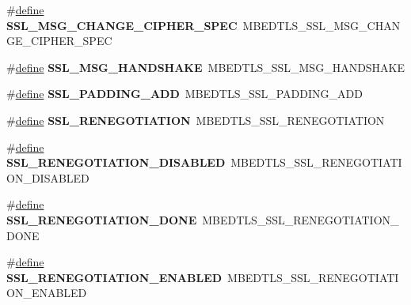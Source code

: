 \begin{DoxyCompactItemize}
\item 
\mbox{\label{compat-1_83_8h_a738eccdfea2b6a0de26231a0c2aafe4f}} 
\#\hyperlink{structdefine}{define} {\bfseries S\+S\+L\+\_\+\+M\+S\+G\+\_\+\+C\+H\+A\+N\+G\+E\+\_\+\+C\+I\+P\+H\+E\+R\+\_\+\+S\+P\+EC}~M\+B\+E\+D\+T\+L\+S\+\_\+\+S\+S\+L\+\_\+\+M\+S\+G\+\_\+\+C\+H\+A\+N\+G\+E\+\_\+\+C\+I\+P\+H\+E\+R\+\_\+\+S\+P\+EC
\item 
\mbox{\label{compat-1_83_8h_add1f218869a9aeb6f8b1190a99f0625a}} 
\#\hyperlink{structdefine}{define} {\bfseries S\+S\+L\+\_\+\+M\+S\+G\+\_\+\+H\+A\+N\+D\+S\+H\+A\+KE}~M\+B\+E\+D\+T\+L\+S\+\_\+\+S\+S\+L\+\_\+\+M\+S\+G\+\_\+\+H\+A\+N\+D\+S\+H\+A\+KE
\item 
\mbox{\label{compat-1_83_8h_a5838cb2225af69ac4e71284c3186b1c6}} 
\#\hyperlink{structdefine}{define} {\bfseries S\+S\+L\+\_\+\+P\+A\+D\+D\+I\+N\+G\+\_\+\+A\+DD}~M\+B\+E\+D\+T\+L\+S\+\_\+\+S\+S\+L\+\_\+\+P\+A\+D\+D\+I\+N\+G\+\_\+\+A\+DD
\item 
\mbox{\label{compat-1_83_8h_aa061ebaead3d10597d95050554179908}} 
\#\hyperlink{structdefine}{define} {\bfseries S\+S\+L\+\_\+\+R\+E\+N\+E\+G\+O\+T\+I\+A\+T\+I\+ON}~M\+B\+E\+D\+T\+L\+S\+\_\+\+S\+S\+L\+\_\+\+R\+E\+N\+E\+G\+O\+T\+I\+A\+T\+I\+ON
\item 
\mbox{\label{compat-1_83_8h_aa5c9fd70cb3431d8ab7280ec69a93a57}} 
\#\hyperlink{structdefine}{define} {\bfseries S\+S\+L\+\_\+\+R\+E\+N\+E\+G\+O\+T\+I\+A\+T\+I\+O\+N\+\_\+\+D\+I\+S\+A\+B\+L\+ED}~M\+B\+E\+D\+T\+L\+S\+\_\+\+S\+S\+L\+\_\+\+R\+E\+N\+E\+G\+O\+T\+I\+A\+T\+I\+O\+N\+\_\+\+D\+I\+S\+A\+B\+L\+ED
\item 
\mbox{\label{compat-1_83_8h_a0293648bc85846f7bf32075bfb6a7427}} 
\#\hyperlink{structdefine}{define} {\bfseries S\+S\+L\+\_\+\+R\+E\+N\+E\+G\+O\+T\+I\+A\+T\+I\+O\+N\+\_\+\+D\+O\+NE}~M\+B\+E\+D\+T\+L\+S\+\_\+\+S\+S\+L\+\_\+\+R\+E\+N\+E\+G\+O\+T\+I\+A\+T\+I\+O\+N\+\_\+\+D\+O\+NE
\item 
\mbox{\label{compat-1_83_8h_a3f3f42e9bf819a4fc589351c103d221b}} 
\#\hyperlink{structdefine}{define} {\bfseries S\+S\+L\+\_\+\+R\+E\+N\+E\+G\+O\+T\+I\+A\+T\+I\+O\+N\+\_\+\+E\+N\+A\+B\+L\+ED}~M\+B\+E\+D\+T\+L\+S\+\_\+\+S\+S\+L\+\_\+\+R\+E\+N\+E\+G\+O\+T\+I\+A\+T\+I\+O\+N\+\_\+\+E\+N\+A\+B\+L\+ED

\end{DoxyCompactItemize}
